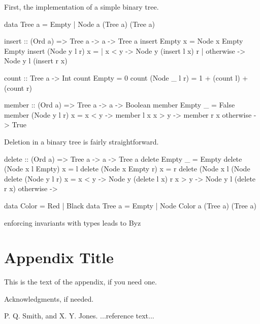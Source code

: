 \documentclass[preprint]{sigplanconf}
\begin{document}
First, the implementation of a simple binary tree.

data Tree a = Empty | Node a (Tree a) (Tree a)

insert :: (Ord a) => Tree a -> a -> Tree a
insert Empty x = Node x Empty Empty
insert (Node y l r) x = | x < y     -> Node y (insert l x) r
                        | otherwise -> Node y l (insert r x)

count :: Tree a -> Int
count Empty = 0
count (Node \_ l r) = 1 + (count l) + (count r)

member :: (Ord a) => Tree a -> a -> Boolean
member Empty \_ = False
member (Node y l r) x = x < y     -> member l x
                        x > y     -> member r x
                        otherwise -> True

Deletion in a binary tree is fairly straightforward.

delete :: (Ord a) => Tree a -> a -> Tree a
delete Empty \_ = Empty
delete (Node x l Empty) x = l
delete (Node x Empty r) x = r
delete (Node x l (Node
delete (Node y l r) x = x < y     -> Node y (delete l x) r
                        x > y     -> Node y l (delete r x)
                        otherwise ->

data Color = Red | Black
data Tree a = Empty | Node Color a (Tree a) (Tree a)

enforcing invariants with types leads to Byz


\appendix
\section{Appendix Title}

This is the text of the appendix, if you need one.

\acks

Acknowledgments, if needed.






\begin{thebibliography}{}
\softraggedright

P. Q. Smith, and X. Y. Jones. ...reference text...

\end{thebibliography}
\end{document}
